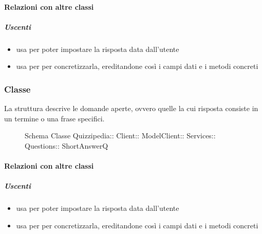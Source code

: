 \paragraph{Relazioni con altre classi}
\subparagraph{Uscenti}
\begin{itemize}
\item usa  per poter impostare la risposta data dall'utente
\item usa  per per concretizzarla, ereditandone così i campi dati e i metodi concreti
\end{itemize}
\subsubsection{Classe }
La struttura descrive le domande aperte, ovvero quelle la cui risposta consiste in un termine o una frase specifici.
\begin{figure}[H]
\centering
\noindent{}
\caption[Schema Classe ShortAnswerQ]{Schema Classe Quizzipedia:: Client:: ModelClient:: Services:: Questions:: ShortAnswerQ}
\end{figure}
\paragraph{Relazioni con altre classi}
\subparagraph{Uscenti}
\begin{itemize}
\item usa  per poter impostare la risposta data dall'utente
\item usa  per per concretizzarla, ereditandone così i campi dati e i metodi concreti
\end{itemize}
